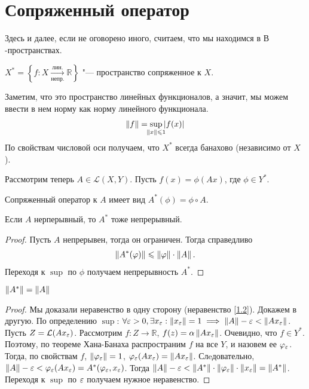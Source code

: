 \section{Сопряженный оператор}

Здесь и далее, если не оговорено иного, считаем, что мы находимся в $В$-пространствах.

\begin{definition}
	$X^* = \left\{ f : X \xrightarrow[\text{непр.}]{\text{лин.}} \mathbb{R} \right\}$ "--- пространство сопряженное к $X$.
\end{definition}
Заметим, что это пространство линейных функционалов, а значит, мы можем ввести в нем норму как норму линейного функционала.
\begin{gather}
    \norm{f} = \sup_{\mathclap{\norm{x} \leqslant 1}} \abs{f(x)}  \\
\end{gather}
По свойствам числовой оси получаем, что $X^*$ всегда банахово (независимо от $X$).

Рассмотрим теперь $A \in \mathcal{L}(X, Y)$. Пусть $f(x) = \phi(Ax)$, где $\phi \in Y^*$.
\begin{definition}
	Сопряженный оператор к $A$ имеет вид $A^*(\phi) = \phi \circ A$.
\end{definition}
\begin{statement}
	Если $A$ нерперывный, то $A^*$ тоже непрерывный.
\end{statement}
\begin{proof}
	Пусть $A$ непрерывен, тогда он ограничен. Тогда справедливо
	\begin{gather}
        \left\|A^*(\varphi)\right\| \leqslant \left\|\varphi\right\| \cdot \left\|A\right\|\text{.} \label{1.2}
	\end{gather}
	Переходя к $\sup$ по $\phi$ получаем непрерывность $A^*$.
\end{proof}
\begin{theorem} \label{th1.2}
	$\left\|A^*\right\| = \left\|A\right\|$
\end{theorem}
\begin{proof}
	Мы доказали неравенство в одну сторону (неравенство \ref{1.2}). Докажем в другую.
	По определению $\sup$: $\forall \varepsilon > 0, \exists x_{\varepsilon} : \left\|x_{\varepsilon}\right\| = 1 \implies \left\|A\right\| - \varepsilon < \left\|Ax_{\varepsilon}\right\|$.
	Пусть $Z = \mathcal{L}(Ax_{\varepsilon})$. Рассмотрим $f : Z \rightarrow \mathbb{R}$, $f(z) = \alpha\left\|Ax_{\varepsilon}\right\|$.
    Очевидно, что $f \in Y^*$.
	Поэтому, по теореме Хана-Банаха распространим $f$ на все $Y$, и назовем ее $\varphi_{\varepsilon}$.
	Тогда, по свойствам $f$, $\left\|\varphi_{\varepsilon}\right\| = 1$, $\varphi_{\varepsilon}(Ax_{\varepsilon}) = \left\|Ax_{\varepsilon}\right\|$.
	Слeдовательно, $\left\|A\right\| - \varepsilon < \varphi_{\varepsilon}(Ax_{\varepsilon}) = A^*(\varphi_{\varepsilon}, x_{\varepsilon})$.
	Тогда $\left\|A\right\| - \varepsilon < \left\|A^*\right\| \cdot \left\|\varphi_{\varepsilon}\right\| \cdot \left\|x_{\varepsilon}\right\| = \left\|A^*\right\|$.
	Переходя к $\sup$ по $\varepsilon$ получаем нужное неравенство.
\end{proof}

